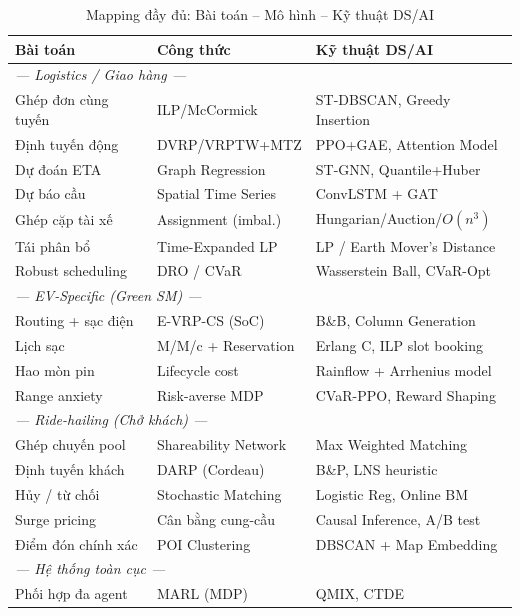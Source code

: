 \documentclass[12pt,a4paper]{article}
\begin{document}
\begin{table}[h!]
\centering
\caption{Mapping đầy đủ: Bài toán -- Mô hình -- Kỹ thuật DS/AI}
\renewcommand{\arraystretch}{1.25}
\begin{tabular}{p{3.4cm}p{3.6cm}p{4.2cm}}
\toprule
\textbf{Bài toán} & \textbf{Công thức} & \textbf{Kỹ thuật DS/AI} \\
\midrule
\multicolumn{3}{l}{\textit{--- Logistics / Giao hàng ---}}\\
Ghép đơn cùng tuyến & ILP/McCormick & ST-DBSCAN, Greedy Insertion \\
Định tuyến động & DVRP/VRPTW+MTZ & PPO+GAE, Attention Model \\
Dự đoán ETA & Graph Regression & ST-GNN, Quantile+Huber \\
Dự báo cầu & Spatial Time Series & ConvLSTM + GAT \\
Ghép cặp tài xế & Assignment (imbal.) & Hungarian/Auction/$O(n^3)$ \\
Tái phân bổ & Time-Expanded LP & LP / Earth Mover's Distance \\
Robust scheduling & DRO / CVaR & Wasserstein Ball, CVaR-Opt \\
\midrule
\multicolumn{3}{l}{\textit{--- EV-Specific (Green SM) ---}}\\
Routing + sạc điện & E-VRP-CS (SoC) & B\&B, Column Generation \\
Lịch sạc & M/M/c + Reservation & Erlang C, ILP slot booking \\
Hao mòn pin & Lifecycle cost & Rainflow + Arrhenius model \\
Range anxiety & Risk-averse MDP & CVaR-PPO, Reward Shaping \\
\midrule
\multicolumn{3}{l}{\textit{--- Ride-hailing (Chở khách) ---}}\\
Ghép chuyến pool & Shareability Network & Max Weighted Matching \\
Định tuyến khách & DARP (Cordeau) & B\&P, LNS heuristic \\
Hủy / từ chối & Stochastic Matching & Logistic Reg, Online BM \\
Surge pricing & Cân bằng cung-cầu & Causal Inference, A/B test \\
Điểm đón chính xác & POI Clustering & DBSCAN + Map Embedding \\
\midrule
\multicolumn{3}{l}{\textit{--- Hệ thống toàn cục ---}}\\
Phối hợp đa agent & MARL (MDP) & QMIX, CTDE \\
\bottomrule
\end{tabular}
\end{table}
\end{document}
